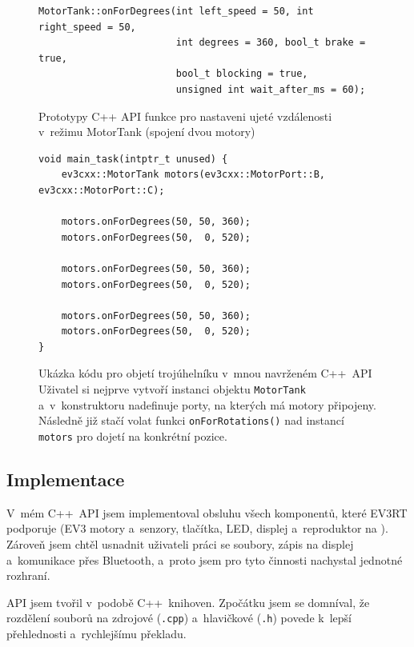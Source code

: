 \begin{figure}[H] 
    \begin{verbatim}
MotorTank::onForDegrees(int left_speed = 50, int right_speed = 50, 
                        int degrees = 360, bool_t brake = true, 
                        bool_t blocking = true, 
                        unsigned int wait_after_ms = 60);
    \end{verbatim}
    \caption[Prototypy C++ API funkce pro nastaveni ujeté vzdálenosti v~režimu MotorTank]{Prototypy C++ API funkce pro nastaveni ujeté vzdálenosti v~režimu MotorTank (spojení dvou motory)}
    \label{src:ev3cxx_motor-rotate}
\end{figure}
\begin{figure}[H] 
    \begin{verbatim}
void main_task(intptr_t unused) {    
    ev3cxx::MotorTank motors(ev3cxx::MotorPort::B, ev3cxx::MotorPort::C);   
    
    motors.onForDegrees(50, 50, 360);
    motors.onForDegrees(50,  0, 520);

    motors.onForDegrees(50, 50, 360);
    motors.onForDegrees(50,  0, 520); 

    motors.onForDegrees(50, 50, 360);
    motors.onForDegrees(50,  0, 520);
}
    \end{verbatim}
    \caption[Ukázka kódu pro objetí trojúhelníku v~mnou navrženém C++~API]{Ukázka kódu pro objetí trojúhelníku v~mnou navrženém C++~API \\
    Uživatel si nejprve vytvoří instanci objektu \texttt{MotorTank} a~v~konstruktoru nadefinuje porty, na kterých má motory připojeny. 
    Následně již stačí volat funkci \texttt{onForRotations()} nad instancí \texttt{motors} pro dojetí na konkrétní pozice.    
    }
    \label{src:ev3cxx-triangle}
\end{figure}

\subsection{Implementace}


V~mém C++~API jsem implementoval obsluhu všech komponentů, které EV3RT podporuje (EV3 motory a~senzory, tlačítka, LED, displej a~reproduktor na ).
Zároveň jsem chtěl usnadnit uživateli práci se soubory, zápis na displej a~komunikace přes Bluetooth, a~proto jsem pro tyto činnosti nachystal  jednotné rozhraní.

API jsem tvořil v~podobě C++~knihoven. 
Zpočátku jsem se domníval, že rozdělení souborů na zdrojové (\texttt{.cpp}) a~hlavičkové (\texttt{.h}) povede k~lepší přehlednosti a~rychlejšímu překladu.

